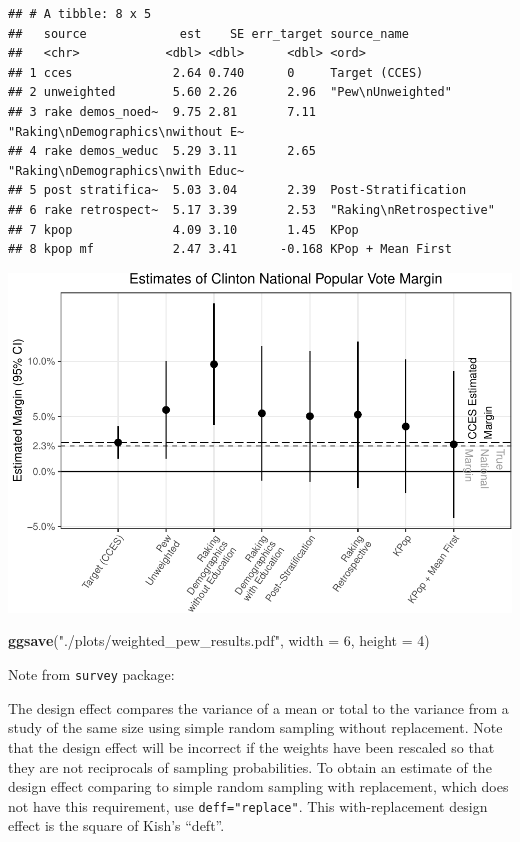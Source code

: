 \documentclass[]{article}
\newenvironment{Shaded}{\begin{snugshade}}{\end{snugshade}}
\newcommand{\DataTypeTok}[1]{\textcolor[rgb]{0.13,0.29,0.53}{#1}}
\newcommand{\DecValTok}[1]{\textcolor[rgb]{0.00,0.00,0.81}{#1}}
\newcommand{\KeywordTok}[1]{\textcolor[rgb]{0.13,0.29,0.53}{\textbf{#1}}}
\newcommand{\NormalTok}[1]{#1}
\newcommand{\StringTok}[1]{\textcolor[rgb]{0.31,0.60,0.02}{#1}}
\begin{document}
\begin{verbatim}
## # A tibble: 8 x 5
##   source             est    SE err_target source_name                      
##   <chr>            <dbl> <dbl>      <dbl> <ord>                            
## 1 cces              2.64 0.740      0     Target (CCES)                    
## 2 unweighted        5.60 2.26       2.96  "Pew\nUnweighted"                
## 3 rake demos_noed~  9.75 2.81       7.11  "Raking\nDemographics\nwithout E~
## 4 rake demos_weduc  5.29 3.11       2.65  "Raking\nDemographics\nwith Educ~
## 5 post stratifica~  5.03 3.04       2.39  Post-Stratification              
## 6 rake retrospect~  5.17 3.39       2.53  "Raking\nRetrospective"          
## 7 kpop              4.09 3.10       1.45  KPop                             
## 8 kpop mf           2.47 3.41      -0.168 KPop + Mean First
\end{verbatim}

\includegraphics{application_clean_files/figure-latex/plot_results-1.pdf}

\begin{Shaded}
\begin{Highlighting}[]
\KeywordTok{ggsave}\NormalTok{(}\StringTok{"./plots/weighted_pew_results.pdf"}\NormalTok{, }\DataTypeTok{width =} \DecValTok{6}\NormalTok{, }\DataTypeTok{height =} \DecValTok{4}\NormalTok{)}
\end{Highlighting}
\end{Shaded}

Note from \texttt{survey} package:

The design effect compares the variance of a mean or total to the
variance from a study of the same size using simple random sampling
without replacement. Note that the design effect will be incorrect if
the weights have been rescaled so that they are not reciprocals of
sampling probabilities. To obtain an estimate of the design effect
comparing to simple random sampling with replacement, which does not
have this requirement, use \texttt{deff="replace"}. This
with-replacement design effect is the square of Kish's ``deft''.
\end{document}
